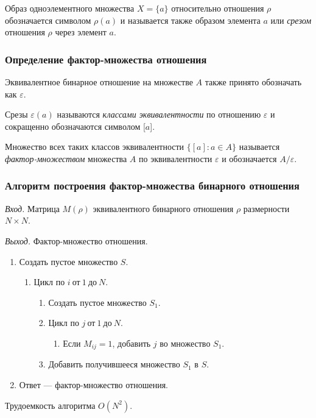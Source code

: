 \documentclass[bachelor, och, labwork]{shiza}
\begin{document}
Образ одноэлементного множества $X=\{a\}$ относительно отношения $\rho$
обозначается символом $\rho(a)$ и называется также образом элемента $a$ или
\textit{срезом} отношения $\rho$ через элемент $a$.

\subsubsection{Определение фактор-множества отношения}

Эквивалентное бинарное отношение на множестве $A$ также принято обозначать как
$\varepsilon$.

Срезы $\varepsilon(a)$ называются \textit{классами эквивалентности} по отношению
$\varepsilon$ и сокращенно обозначаются символом [$a$].

Множество всех таких классов эквивалентности $\{[a]:a\in A\}$ называется 
\textit{фактор-множеством} множества $A$ по эквивалентности $\varepsilon$ и 
обозначается $A/\varepsilon$.

\subsubsection{Алгоритм построения фактор-множества бинарного отношения}

\textit{Вход.} Матрица $M(\rho)$ эквивалентного бинарного отношения $\rho$ размерности
$N \times N$.

\textit{Выход.} Фактор-множество отношения.

\begin{enumerate}
    \item Создать пустое множество $S$.
    \begin{enumerate}[label=a)]
        \item Цикл по $i ~\text{от}~ 1 ~\text{до}~ N$.
            \begin{enumerate} 
                \item Создать пустое множество $S_1$.
                \item Цикл по $j ~\text{от}~ 1 ~\text{до}~ N$.
                    \begin{enumerate}[label=1.]\item Если $M_{ij} = 1$, добавить $j$ во множество $S_1$.\end{enumerate}
                \item Добавить получившееся множество $S_1$ в $S$.
            \end{enumerate}
    \end{enumerate}
    \item Ответ --- фактор-множество отношения.
\end{enumerate}
    Трудоемкость алгоритма $O(N^2)$.
\end{document}
